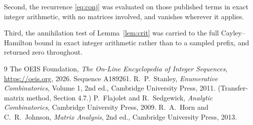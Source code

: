 \documentclass[11pt,a4paper]{article}
\theoremstyle{plain}
\theoremstyle{definition}
\begin{document}
Second, the recurrence \eqref{eq:conj} was evaluated on those published terms in exact
integer arithmetic, with no matrices involved, and vanishes wherever it applies.

Third, the annihilation test of Lemma~\ref{lem:crit} was carried to the full
Cayley--Hamilton bound in exact integer arithmetic rather than to a sampled prefix, and
returned zero throughout.

\begin{thebibliography}{9}
 The OEIS Foundation, \emph{The On-Line Encyclopedia of Integer
Sequences}, \url{https://oeis.org}, 2026. Sequence A189261.
 R.~P.~Stanley, \emph{Enumerative Combinatorics}, Volume 1, 2nd ed.,
Cambridge University Press, 2011. (Transfer-matrix method, Section 4.7.)
 P.~Flajolet and R.~Sedgewick, \emph{Analytic Combinatorics}, Cambridge
University Press, 2009.
 R.~A.~Horn and C.~R.~Johnson, \emph{Matrix Analysis}, 2nd ed., Cambridge
University Press, 2013.
\end{thebibliography}
\end{document}
